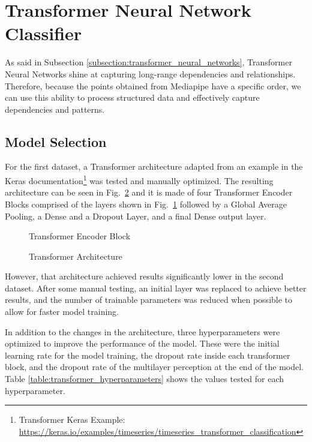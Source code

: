 \section{Transformer Neural Network Classifier}
\label{section:transformer_classifier}

As said in Subsection \ref{subsection:transformer_neural_networks}, Transformer Neural Networks shine at capturing long-range dependencies and relationships. Therefore, because the points obtained from Mediapipe have a specific order, we can use this ability to process structured data and effectively capture dependencies and patterns.

\subsection{Model Selection}

For the first dataset, a Transformer architecture adapted from an example in the Keras documentation\footnote{Transformer Keras Example: \url{https://keras.io/examples/timeseries/timeseries_transformer_classification}} was tested and manually optimized. The resulting architecture can be seen in Fig.~\ref{fig:transformer_architecture_dataset1} and it is made of four Transformer Encoder Blocks comprised of the layers shown in Fig.~\ref{fig:transformer_encoder_architecture} followed by a Global Average Pooling, a Dense and a Dropout Layer, and a final Dense output layer.

\begin{figure}[H]
    \centering
    {\fontsize{10}{12}\selectfont}
    \caption[Transformer Encoder Block]{Transformer Encoder Block}
    \label{fig:transformer_encoder_architecture}
\end{figure}

\begin{figure}[H]
    \centering
    {\fontsize{10}{12}\selectfont}
    \caption[Transformer Architecture]{Transformer Architecture}
    \label{fig:transformer_architecture_dataset1}
\end{figure}

However, that architecture achieved results significantly lower in the second dataset. After some manual testing, an initial layer was replaced to achieve better results, and the number of trainable parameters was reduced when possible to allow for faster model training.

In addition to the changes in the architecture, three hyperparameters were optimized to improve the performance of the model. These were the initial learning rate for the model training, the dropout rate inside each transformer block, and the dropout rate of the multilayer perception at the end of the model. Table \ref{table:transformer_hyperparameters} shows the values tested for each hyperparameter.

